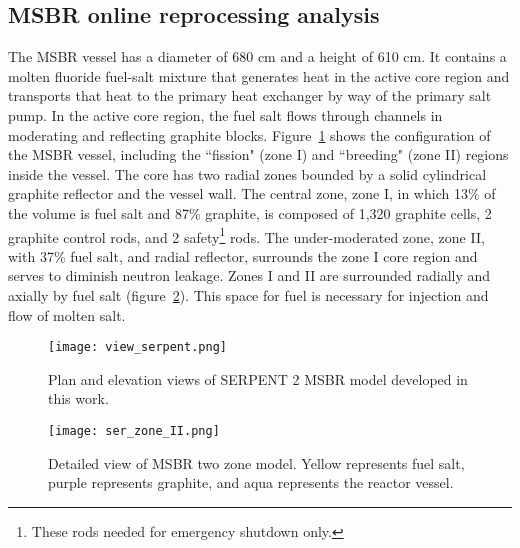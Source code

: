 \subsection{MSBR online reprocessing analysis} \label{sec:msbr_reproc}
The \gls{MSBR} vessel has a diameter of 680 cm and a height of 610 cm. It 
contains a molten fluoride fuel-salt mixture that generates heat in the active 
core region and transports that heat to the primary heat exchanger by way of 
the primary salt pump. In the active core region, the fuel salt flows through 
channels in moderating and reflecting graphite blocks. 
Figure~\ref{fig:serpent_plan_view} shows the configuration of the 
\gls{MSBR} vessel, including the ``fission" (zone I) and ``breeding" 
(zone II) regions inside the vessel. The core has two radial zones bounded by a 
solid cylindrical graphite reflector and the vessel wall. The central zone, 
zone I, in which 13\% of the volume is fuel salt and 87\% graphite, is
composed of 1,320 graphite cells, 2 graphite control rods, and 2 
safety\footnote{ These rods needed for emergency shutdown only.} rods. The 
under-moderated zone, zone II, with 37\% fuel salt, and radial reflector, 
surrounds the zone I core region and serves to diminish neutron leakage. Zones 
I and II are surrounded radially and axially by fuel salt 
(figure~\ref{fig:serpent_zoneII}). This space for fuel is necessary for 
injection and flow of molten salt.
\begin{figure}[hbp!] %
  \texttt{[image: view\_serpent.png]}
  \caption{Plan and elevation views of SERPENT 2 \gls{MSBR} model developed in 
  this work.}
  \label{fig:serpent_plan_view}
\end{figure}
\begin{figure}[t!] %
  \texttt{[image: ser\_zone\_II.png]}
  \caption{Detailed view of \gls{MSBR} two zone model. 
          Yellow represents fuel salt, purple represents graphite, and aqua represents the reactor vessel.}
  \label{fig:serpent_zoneII}
\end{figure}

